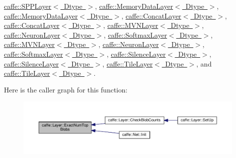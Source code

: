 \mbox{\hyperlink{classcaffe_1_1_s_p_p_layer_a345f640e6c1d3e9ee929d706b68300e9}{caffe\+::\+S\+P\+P\+Layer$<$ Dtype $>$}}, \mbox{\hyperlink{classcaffe_1_1_memory_data_layer_af714b4cbc022be1592ad26c300b63ae4}{caffe\+::\+Memory\+Data\+Layer$<$ Dtype $>$}}, \mbox{\hyperlink{classcaffe_1_1_memory_data_layer_af714b4cbc022be1592ad26c300b63ae4}{caffe\+::\+Memory\+Data\+Layer$<$ Dtype $>$}}, \mbox{\hyperlink{classcaffe_1_1_concat_layer_a0f19a4cac8676927f9c83010957a2921}{caffe\+::\+Concat\+Layer$<$ Dtype $>$}}, \mbox{\hyperlink{classcaffe_1_1_concat_layer_a0f19a4cac8676927f9c83010957a2921}{caffe\+::\+Concat\+Layer$<$ Dtype $>$}}, \mbox{\hyperlink{classcaffe_1_1_m_v_n_layer_ae10d9ef135adf3cd25e86ce06188c814}{caffe\+::\+M\+V\+N\+Layer$<$ Dtype $>$}}, \mbox{\hyperlink{classcaffe_1_1_neuron_layer_a47ac5e7208e4b14ad1e4040a621dbfbc}{caffe\+::\+Neuron\+Layer$<$ Dtype $>$}}, \mbox{\hyperlink{classcaffe_1_1_softmax_layer_a6bc4748c20e0940e5367ed4d50f4a11b}{caffe\+::\+Softmax\+Layer$<$ Dtype $>$}}, \mbox{\hyperlink{classcaffe_1_1_m_v_n_layer_ae10d9ef135adf3cd25e86ce06188c814}{caffe\+::\+M\+V\+N\+Layer$<$ Dtype $>$}}, \mbox{\hyperlink{classcaffe_1_1_neuron_layer_a47ac5e7208e4b14ad1e4040a621dbfbc}{caffe\+::\+Neuron\+Layer$<$ Dtype $>$}}, \mbox{\hyperlink{classcaffe_1_1_softmax_layer_a6bc4748c20e0940e5367ed4d50f4a11b}{caffe\+::\+Softmax\+Layer$<$ Dtype $>$}}, \mbox{\hyperlink{classcaffe_1_1_silence_layer_a1e072cbda98dbc57001ce92432b045b8}{caffe\+::\+Silence\+Layer$<$ Dtype $>$}}, \mbox{\hyperlink{classcaffe_1_1_silence_layer_a1e072cbda98dbc57001ce92432b045b8}{caffe\+::\+Silence\+Layer$<$ Dtype $>$}}, \mbox{\hyperlink{classcaffe_1_1_tile_layer_a1040cc3b4fb028d54f67a685513d745b}{caffe\+::\+Tile\+Layer$<$ Dtype $>$}}, and \mbox{\hyperlink{classcaffe_1_1_tile_layer_a1040cc3b4fb028d54f67a685513d745b}{caffe\+::\+Tile\+Layer$<$ Dtype $>$}}.

Here is the caller graph for this function\+:
\nopagebreak
\begin{figure}[H]
\begin{center}
\leavevmode
\includegraphics[width=350pt]{classcaffe_1_1_layer_a64e2ca72c719e4b2f1f9216ccfb0d37f_icgraph}
\end{center}
\end{figure}
\mbox{\label{classcaffe_1_1_layer_ab57d272dabe8c709d2a785eebe72ca57}} 
